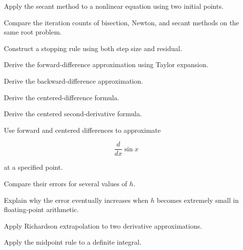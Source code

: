 \begin{exercise}[3]
Apply the secant method to a nonlinear equation using two initial points.
\end{exercise}

\begin{exercise}[3]
Compare the iteration counts of bisection, Newton, and secant methods on
the same root problem.
\end{exercise}

\begin{exercise}[3]
Construct a stopping rule using both step size and residual.
\end{exercise}

\begin{exercise}[2]
Derive the forward-difference approximation using Taylor expansion.
\end{exercise}

\begin{exercise}[2]
Derive the backward-difference approximation.
\end{exercise}

\begin{exercise}[3]
Derive the centered-difference formula.
\end{exercise}

\begin{exercise}[3]
Derive the centered second-derivative formula.
\end{exercise}

\begin{exercise}[3]
Use forward and centered differences to approximate

\[
\frac{d}{dx}\sin x
\]

at a specified point.
\end{exercise}

\begin{exercise}[3]
Compare their errors for several values of \(h\).
\end{exercise}

\begin{exercise}[3]
Explain why the error eventually increases when \(h\) becomes extremely
small in floating-point arithmetic.
\end{exercise}

\begin{exercise}[3]
Apply Richardson extrapolation to two derivative approximations.
\end{exercise}

\begin{exercise}[2]
Apply the midpoint rule to a definite integral.
\end{exercise}

